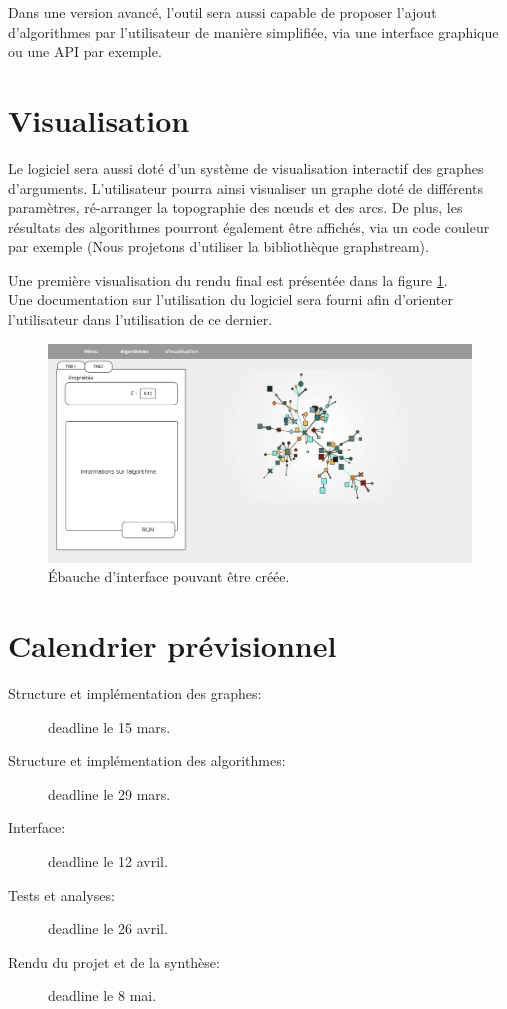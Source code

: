 \documentclass[a4paper, 11pt]{article}
\begin{document}
Dans une version avancé, l'outil sera aussi capable de proposer l'ajout d’algorithmes par l'utilisateur de manière simplifiée, via une interface graphique ou une API par exemple.\\

\section{Visualisation}
Le logiciel sera aussi doté d'un système de visualisation interactif des graphes d’arguments. L'utilisateur pourra ainsi visualiser un graphe doté de différents paramètres, ré-arranger la topographie des nœuds et des arcs. De plus, les résultats des algorithmes pourront également être affichés, via un code couleur par exemple (Nous projetons d'utiliser la bibliothèque graphstream). 

Une première visualisation du rendu final est présentée dans la figure \ref{image}. \\

Une documentation sur l'utilisation du logiciel sera fourni afin d'orienter l'utilisateur dans l'utilisation de ce dernier.\\

\begin{figure}[h]
\includegraphics[width=13cm]{Wireframe.png}
\caption{Ébauche d'interface pouvant être créée.}
\label{image}
\end{figure}

\section{Calendrier prévisionnel}

\begin{description}
\item[Structure et implémentation des graphes: ] deadline le 15 mars.
\item[Structure et implémentation des algorithmes: ] deadline le 29 mars.
\item[Interface: ] deadline le 12 avril.
\item[Tests et analyses: ] deadline le 26 avril.
\item[Rendu du projet et de la synthèse: ] deadline le 8 mai.


\end{description}
\end{document}
